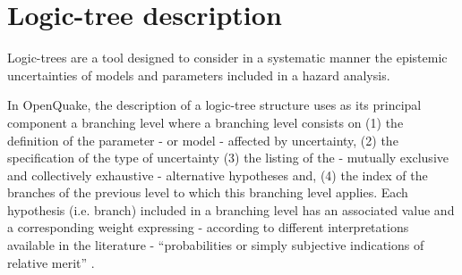 \section{Logic-tree description}
\label{hazard:logic_tree}
Logic-trees are a tool designed to consider in a systematic manner the 
epistemic uncertainties of models and parameters included in a hazard 
analysis.

In OpenQuake, the description of a logic-tree structure uses as its principal 
component a branching level where a branching level consists on (1) the 
definition of the parameter - or model - affected by uncertainty, (2) the 
specification of the type of uncertainty (3) the listing of the - mutually 
exclusive and collectively exhaustive \citep{bommer2008} - alternative 
hypotheses and, (4) the index of the branches of the previous level to which 
this branching level applies.
%
Each hypothesis (i.e. branch) included in a branching level has an associated value and a corresponding weight expressing - according to different interpretations available in the literature - ``probabilities or simply subjective indications of relative merit'' \citep[][pagecon 999]{bommer2008}.

